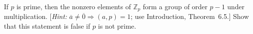 If \(p\) is prime, then the nonzero elements of \(\mathbb{Z}_p\) form a
group of order \(p - 1\) under multiplication. [\textit{Hint:} \(\overline{a}\ne
\overline{0}\Rightarrow (a, p) = 1\); use Introduction, Theorem~6.5.] Show
that this statement is false if \(p\) is not prime.